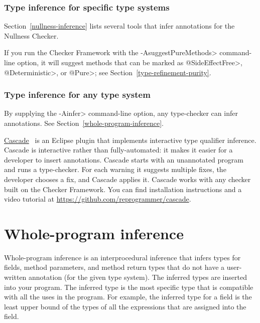 \subsubsection{Type inference for specific type systems\label{type-inference-tools-specialized}}

Section~\ref{nullness-inference} lists several tools that infer
annotations for the Nullness Checker.

If you run the Checker Framework with the \<-AsuggestPureMethods>
command-line option, it will suggest methods that can be marked as
\<@SideEffectFree>, \<@Deterministic>, or \<@Pure>; see
Section~\ref{type-refinement-purity}.


\subsubsection{Type inference for any type system\label{type-inference-tools-general}}

By supplying the \<-Ainfer> command-line option,
any type-checker can infer annotations. See Section~\ref{whole-program-inference}.

\href{https://github.com/reprogrammer/cascade/}{Cascade}~\cite{VakilianPEJ2014}
is an Eclipse plugin that implements interactive type qualifier inference.
Cascade is interactive rather than fully-automated:  it makes it easier for
a developer to insert annotations.
Cascade starts with an unannotated program and runs a type-checker.  For each
warning it suggests multiple fixes, the developer chooses a fix, and
Cascade applies it.  Cascade works with any checker built on the Checker
Framework.
You can find installation instructions and a video tutorial at \url{https://github.com/reprogrammer/cascade}.


\section{Whole-program inference\label{whole-program-inference}}

Whole-program inference is an interprocedural inference that
infers types for fields, method parameters, and method return types that do not
have a user-written annotation (for the given type system).
The inferred types are inserted into
your program.
The inferred type is the most specific type that is compatible with all the
uses in the program.  For example, the inferred type for a field is the
least upper bound of the types of all the expressions that are assigned
into the field.

